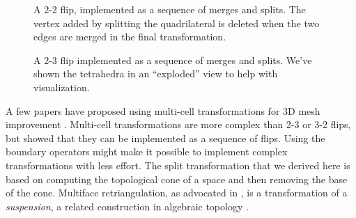 \documentclass[twocolumn]{article}
\begin{document}
\begin{figure}[h]
\begin{center}
    \end{center}
    \caption{A 2-2 flip, implemented as a sequence of merges and splits.
    The vertex added by splitting the quadrilateral is deleted when the two edges are merged in the final transformation.}
    \label{fig:2-2-flip}
\end{figure}

\begin{figure}[h]
    \begin{center}
        
    \end{center}
    \caption{A 2-3 flip implemented as a sequence of merges and splits.
    We've shown the tetrahedra in an ``exploded'' view to help with visualization.}
    \label{fig:2-3-flip}
\end{figure}

A few papers have proposed using multi-cell transformations for 3D mesh improvement \cite{klingner2008aggressive}.
Multi-cell transformations are more complex than 2-3 or 3-2 flips, but \cite{misztal2009tetrahedral} showed that they can be implemented as a sequence of flips.
Using the boundary operators might make it possible to implement complex transformations with less effort.
The split transformation that we derived here is based on computing the topological cone of a space and then removing the base of the cone.
Multiface retriangulation, as advocated in \cite{misztal2009tetrahedral}, is a transformation of a \emph{suspension}, a related construction in algebraic topology \cite{hatcher2002algebraic}.
\end{document}
